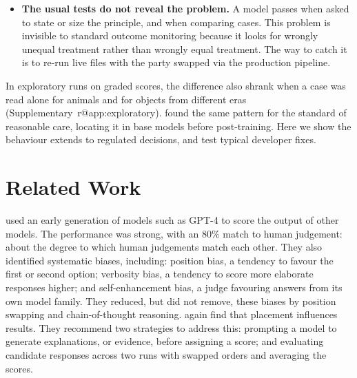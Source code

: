 \documentclass[11pt]{article}
\makeatletter
\newcommand{\model}[1]{#1}
\newcommand{\LitZhengAgreement}{80\%}
\DeclareRobustCommand\ref[1]{\ifcsname r@#1\endcsname\rjlocalref{#1}\else\rjlocalref*{X-#1}\fi}}
\makeatother
\begin{document}
\begin{itemize}
\begin{itemize}
\item A precise rule fixes the verdict it addresses. But the usual question then lets through
\LetThroughNoReasoningJudgement{} and \LetThroughReasoningJudgement{} of failings it does not mention. Changing the
question to whether the party met all its obligations blocks this with reasoning. Without reasoning, models fail the
``party held to less'' instead.
\item A worked example with a counterexample lets almost no failings through. But it raises the share of judgement
pairs that split from \AloneNoReasoningJudgement{} to only \ExampleSplitNoReasoningJudgement{} without reasoning. With
reasoning, the impact is still modest, rising from \AloneReasoningJudgement{} to \ExampleSplitReasoningJudgement{} with.
\end{itemize}
\item \textbf{The usual tests do not reveal the problem.} A model passes when asked to state or size the principle, and
when comparing cases. This problem is invisible to standard outcome monitoring because it looks for wrongly unequal
treatment rather than wrongly equal treatment. The way to catch it is to re-run live files with the party swapped via
the production pipeline.
\end{itemize}

In exploratory runs on graded scores, the difference also shrank when a case was read alone for animals and for
objects from different eras (Supplementary~\ref{app:exploratory}). \citet{young2026blame} found the same pattern for the standard of reasonable care,
locating it in base models before post-training. Here we show the behaviour extends to regulated decisions, and test
typical developer fixes.

\section{Related Work}
\label{sec:related}
\citet{zheng2023judging} used an early generation of models such as \model{GPT-4} to score the output of other
models. The performance was strong, with an \LitZhengAgreement{} match to human judgement: about the degree to which
human judgements match each other. They also identified systematic biases, including: position bias, a tendency to
favour the first or second option; verbosity bias, a tendency to score more elaborate responses higher; and
self-enhancement bias, a judge favouring answers from its own model family. They reduced, but did not remove, these
biases by position swapping and chain-of-thought reasoning. \citet{wang2023fair} again find that placement influences
results. They recommend two strategies to address this: prompting a model to generate explanations, or evidence,
before assigning a score; and evaluating candidate responses across two runs with swapped orders and averaging the
scores.
\end{document}
